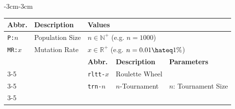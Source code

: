 
\begin{adjustwidth}{-3cm}{-3cm}

    \centering
    \begin{tabular}{|l|l|lll|}
    \hline
    \rowcolor[HTML]{DCDCDC} 
    \textbf{Abbr.}                   & \textbf{Description}                                & \multicolumn{3}{l|}{\cellcolor[HTML]{DCDCDC}\textbf{Values}}                                                                                                                                                         \\ \hline
    \texttt{P:}$n$                   & Population Size                                     & \multicolumn{3}{l|}{$n \in \mathbb{N}^+$ (e.g. $n = 1000$)}                                                                                                                                                           \\ \hline
    \texttt{MR:}$x$                  & Mutation Rate                                       & \multicolumn{3}{l|}{$x \in \mathbb{R}^+$ (e.g. $n = 0.01 \hateq 1\%$)}                                                                                                                                                \\ \hline
                                     &                                                     & \multicolumn{1}{l|}{\cellcolor[HTML]{EFEFEF}\textbf{Abbr.}} & \multicolumn{1}{l|}{\cellcolor[HTML]{EFEFEF}\textbf{Description}}                      & \cellcolor[HTML]{EFEFEF}\textbf{Parameters}                   \\ \cline{3-5} 
                                     &                                                     & \multicolumn{1}{l|}{\texttt{rltt-}$x$}                      & \multicolumn{1}{l|}{Roulette Wheel}                                                    &                                                               \\ \cline{3-5} 
                                     &                                                     & \multicolumn{1}{l|}{\texttt{trn-}$n$}                       & \multicolumn{1}{l|}{$n$-Tournament}                                                    & $n$: Tournament Size                                          \\ \cline{3-5} 

\end{tabular}
\end{adjustwidth}
